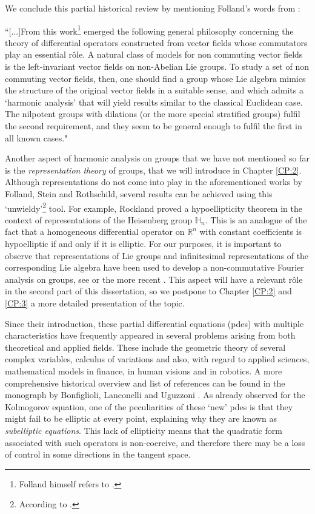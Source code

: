 \documentclass[12pt,oneside,a4paper]{book}
\numberwithin{equation}{section}     %
\theoremstyle{plain}
\theoremstyle{definition}
\newcommand{\R}{{\mathbb R}}
\newcommand{\h}{{\mathbb H}}
\newcommand{\Rn}{{\R}^n}
\begin{document}
We conclude this partial historical review by mentioning Folland's words from \cite{F1977}:

``[...]From this work\footnote{Folland himself refers to \cite{Rothschild-Stein:AM-1976}.} emerged the following general philosophy concerning the theory of differential operators constructed from vector fields whose commutators play an essential r\^ole. A natural class of models for non commuting vector fields is the left-invariant vector fields on non-Abelian Lie groups. To study a set of non commuting vector fields, then, one should find a group whose Lie algebra mimics the structure of the original vector fields in a suitable sense, and which admits a `harmonic analysis' that will yield results similar to the classical Euclidean case. The nilpotent groups with dilations (or the more special stratified groups) fulfil the second requirement, and they seem to be general enough to fulfil the first in all known cases." 

Another aspect of harmonic analysis on groups that we have not mentioned so far is the \textit{representation theory} of groups, that we will introduce in Chapter \ref{CP:2}. Although representations do not come into play in the aforementioned works by Folland, Stein and Rothschild, several results can be achieved using this `unwieldy'\footnote{According to \cite{F1977}.} tool. For example, Rockland proved a hypoellipticity theorem \cite{Rockland}  in the context of representations of the Heisenberg group $\h_n$. This is an analogue of the fact that a homogeneous differential operator on $\Rn$ with constant coefficients is hypoelliptic if and only if it is elliptic. For our purposes, it is important to observe that representations of Lie groups and infinitesimal representations of the corresponding Lie algebra have been used to develop a non-commutative Fourier analysis on groups, see \cite{Fol,F1994,T1986} or the more recent \cite{FR2016,RT2009}. This aspect will have a relevant r\^ole in the second part of this dissertation, so we postpone to Chapter \ref{CP:2} and \ref{CP:3} a more detailed presentation of the topic.

Since their introduction, these partial differential equations (pdes) with multiple characteristics have frequently appeared in several problems arising from both theoretical and applied fields. These include the geometric theory of several complex variables, calculus of variations and also, with regard to applied sciences, mathematical models in finance, in human visions and in robotics. A more comprehensive historical overview and list of references can be found in the monograph by Bonfiglioli, Lanconelli and Uguzzoni \cite{BLU}. As already observed for the Kolmogorov equation, one of the peculiarities of these `new' pdes is that they might fail to be elliptic at every point, explaining why they are known as \textit{subelliptic equations}. This lack of ellipticity means that the quadratic form associated with such operators is non-coercive, and therefore there may be a loss of control in some directions in the tangent space.
\end{document}
